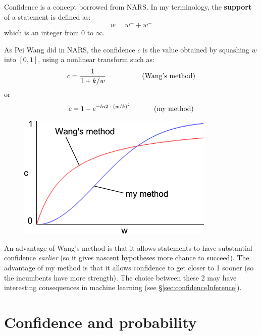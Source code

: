 Confidence is a concept borrowed from NARS.  In my terminology, the \textbf{support} of a statement is defined as:
\begin{equation}
w = w^+ + w^-
\end{equation}
which is an integer from 0 to $\infty$.

As Pei Wang did in NARS, the confidence $c$ is the value obtained by squashing $w$ into $[0,1]$, using a nonlinear transform such as:
\begin{equation}
 c = \frac{1}{1 + k/w} \hspace*{1.8cm}  \mbox{(Wang's method)}
\end{equation}
or \vspace{-0.3cm}
\begin{equation}
 c = 1 - e^{-ln2 \; \cdot \; (w / k)^2} \hspace*{1.2cm}  \mbox{(my method)}
\end{equation}
\vspace{-0.8cm}

\begin{figure}[H]
\centering
\includegraphics[scale=0.8]{Wang-vs-YKY-confidence-squashing-fn.png}
\end{figure}

An advantage of Wang's method is that it allows statements to have substantial confidence \textit{earlier} (so it gives nascent hypotheses more chance to succeed).  The advantage of my method is that it allows confidence to get closer to 1 sooner (so the incumbents have more strength).  The choice between these 2 may have interesting consequences in machine learning (see \S\ref{sec:confidenceInference}).

\section{Confidence and probability}

